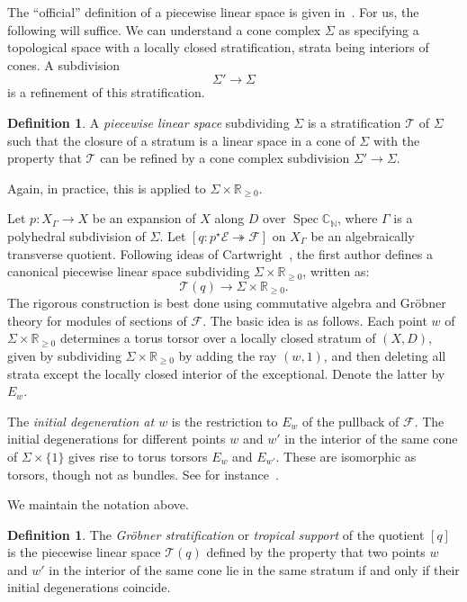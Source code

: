 \documentclass[11pt]{amsart}
\theoremstyle{definition}
\theoremstyle{definition}
\newtheorem{definition}[theorem]{Definition}
\newcommand{\RR}{\mathbb{R}}
\newcommand{\Spec}{\operatorname{Spec}}
\begin{document}
The ``official'' definition of a piecewise linear space is given in~\cite{Logquot}. For us, the following will suffice. We can understand a cone complex $\Sigma$ as specifying a topological space  with a locally closed stratification, strata being interiors of cones. A subdivision 
\[
\Sigma'\to \Sigma
\]
is a refinement of this stratification. 

\begin{definition}
A {\it piecewise linear space} subdividing $\Sigma$ is a stratification $\mathscr T$ of $\Sigma$ such that the closure of a stratum is a linear space in a cone of $\Sigma$ with the property that $\mathscr T$ can be refined by a cone complex subdivision $\Sigma'\to\Sigma$. 
\end{definition}

Again, in practice, this is applied to $\Sigma\times\mathbb R_{\geq 0}$.

Let $p\colon X_\Gamma\to X$ be an expansion of $X$ along $D$ over $\Spec\mathbb C_{\mathbb N}$, where $\Gamma$ is a polyhedral subdivision of $\Sigma$. Let $[q\colon p^\star\mathcal E\twoheadrightarrow \mathcal F]$ on $X_\Gamma$ be an algebraically transverse quotient. Following ideas of Cartwright~\cite{Cartwright}, the first author defines a canonical piecewise linear space subdividing $\Sigma\times \RR_{\geq 0}$, written as: 
\[
\mathscr T(q)\to \Sigma \times \RR_{\geq 0}.
\]
The rigorous construction is best done using commutative algebra and Gr\"obner theory for modules of sections of $\mathcal F$. The basic idea is as follows. Each point $w$ of $\Sigma \times \RR_{\geq 0}$ determines  a torus torsor over a locally closed stratum of $(X,D)$, given by subdividing $\Sigma\times\mathbb R_{\geq 0}$ by adding the ray $(w,1)$, and then deleting all strata except the locally closed interior of the exceptional. Denote the latter by $E_w$. 

The {\it initial degeneration at $w$} is the restriction to $E_w$ of the pullback of $\mathcal F$. The initial degenerations for different points $w$ and $w'$ in the interior of the same cone of $\Sigma\times \{1\}$ gives rise to torus torsors $E_w$ and $E_{w'}$. These are isomorphic as torsors, though not as bundles. See for instance~\cite{PayFibers}. 

We maintain the notation above.

\begin{definition}
The {\it Gr\"obner stratification} or {\it tropical support} of the quotient $[q]$ is the piecewise linear space $\mathscr T(q)$ defined by the property that two points $w$ and $w'$ in the interior of the same cone lie in the same stratum if and only if their initial degenerations coincide. 
\end{definition}
\end{document}
